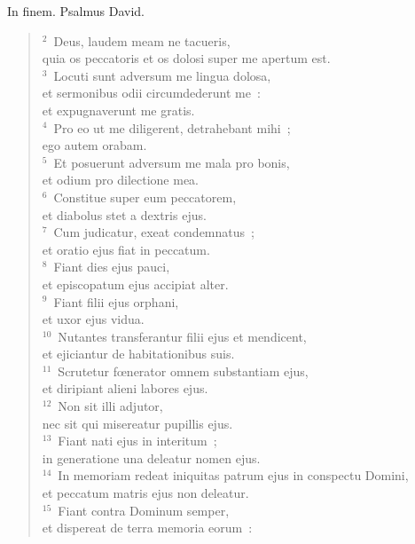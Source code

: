 \bchapter
\lettrine[lines=3,image=true,loversize=0.05,lraise=-0.03]{I}{}n finem. Psalmus David.
\begin{flushleft}\begin{verse}\vspace{6pt}${}^{2}$~Deus, laudem meam ne tacueris,\\ quia os peccatoris et os dolosi super me apertum est.\\
${}^{3}$~Locuti sunt adversum me lingua dolosa,\\ et sermonibus odii circumdederunt me~:\\ et expugnaverunt me gratis.\\
${}^{4}$~Pro eo ut me diligerent, detrahebant mihi~;\\ ego autem orabam.\\
${}^{5}$~Et posuerunt adversum me mala pro bonis,\\ et odium pro dilectione mea.\\
${}^{6}$~Constitue super eum peccatorem,\\ et diabolus stet a dextris ejus.\\
${}^{7}$~Cum judicatur, exeat condemnatus~;\\ et oratio ejus fiat in peccatum.\\
${}^{8}$~Fiant dies ejus pauci,\\ et episcopatum ejus accipiat alter.\\
${}^{9}$~Fiant filii ejus orphani,\\ et uxor ejus vidua.\\
${}^{10}$~Nutantes transferantur filii ejus et mendicent,\\ et ejiciantur de habitationibus suis.\\
${}^{11}$~Scrutetur fœnerator omnem substantiam ejus,\\ et diripiant alieni labores ejus.\\
${}^{12}$~Non sit illi adjutor,\\ nec sit qui misereatur pupillis ejus.\\
${}^{13}$~Fiant nati ejus in interitum~;\\ in generatione una deleatur nomen ejus.\\
${}^{14}$~In memoriam redeat iniquitas patrum ejus in conspectu Domini,\\ et peccatum matris ejus non deleatur.\\
${}^{15}$~Fiant contra Dominum semper,\\ et dispereat de terra memoria eorum~:\\

\end{verse}
\end{flushleft}
